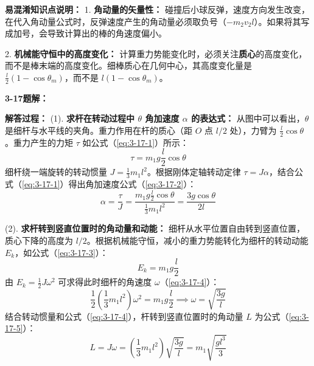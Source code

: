 \vspace{1em}

\textbf{易混淆知识点说明：}
1. \textbf{角动量的矢量性：} 碰撞后小球反弹，速度方向发生改变，在代入角动量公式时，反弹速度产生的角动量必须取负号（$-m_2 v_2 l$）。如果将其写成加号，会导致计算出的棒的角速度偏小。

2. \textbf{机械能守恒中的高度变化：} 计算重力势能变化时，必须关注\textbf{质心}的高度变化，而不是棒末端的高度变化。细棒质心在几何中心，其高度变化量是 $\frac{l}{2}(1-\cos\theta_m)$，而不是 $l(1-\cos\theta_m)$。

\vspace{2em}

\textbf{3-17题解：}
\setcounter{equation}{0}
\renewcommand{\theHequation}{3-17.\arabic{equation}}

\textbf{解答过程：}
(1). \textbf{求杆在转动过程中 $\theta$ 角加速度 $\alpha$ 的表达式：}
从图中可以看出，$\theta$ 是细杆与水平线的夹角。重力作用在杆的质心（距 $O$ 点 $l/2$ 处），力臂为 $\frac{l}{2}\cos\theta$。重力产生的力矩 $\tau$ 如公式（\ref{eq:3-17-1}）所示：
\begin{equation}\label{eq:3-17-1}
	\tau = m_1 g \frac{l}{2} \cos\theta
\end{equation}
细杆绕一端旋转的转动惯量 $J = \frac{1}{3}m_1 l^2$。根据刚体定轴转动定律 $\tau = J\alpha$，结合公式（\ref{eq:3-17-1}）得出角加速度公式（\ref{eq:3-17-2}）：
\begin{equation}\label{eq:3-17-2}
	\alpha = \frac{\tau}{J} = \frac{m_1 g \frac{l}{2} \cos\theta}{\frac{1}{3}m_1 l^2} = \frac{3g \cos\theta}{2l}
\end{equation}

(2). \textbf{求杆转到竖直位置时的角动量和动能：}
细杆从水平位置自由转到竖直位置，质心下降的高度为 $l/2$。根据机械能守恒，减小的重力势能转化为细杆的转动动能 $E_k$，如公式（\ref{eq:3-17-3}）：
\begin{equation}\label{eq:3-17-3}
	E_k = m_1 g \frac{l}{2}
\end{equation}
由 $E_k = \frac{1}{2}J\omega^2$ 可求得此时细杆的角速度 $\omega$（\ref{eq:3-17-4}）：
\begin{equation}\label{eq:3-17-4}
	\frac{1}{2}\left(\frac{1}{3}m_1 l^2\right)\omega^2 = m_1 g \frac{l}{2} \implies \omega = \sqrt{\frac{3g}{l}}
\end{equation}
结合转动惯量和公式（\ref{eq:3-17-4}），杆转到竖直位置时的角动量 $L$ 为公式（\ref{eq:3-17-5}）：
\begin{equation}\label{eq:3-17-5}
	L = J\omega = \left(\frac{1}{3}m_1 l^2\right)\sqrt{\frac{3g}{l}} = m_1 \sqrt{\frac{g l^3}{3}}
\end{equation}

